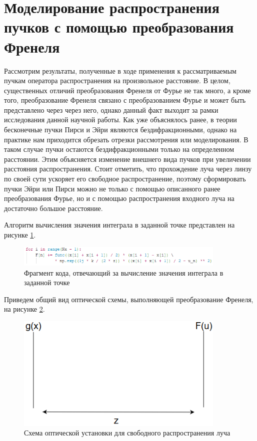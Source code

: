 \section[Моделирование распространения пучков с помощью преобразования Френеля]{\nohyphens{Моделирование распространения пучков с помощью преобразования Френеля}}{
	Рассмотрим результаты, полученные в ходе применения к рассматриваемым пучкам оператора распространения на произвольное расстояние.  В целом, существенных отличий преобразования Френеля от Фурье не так много, а кроме того, преобразование Френеля связано с преобразованием Фурье и может быть представлено через через него, однако данный факт выходит за рамки исследования данной научной работы. Как уже объяснялось ранее, в теории бесконечные пучки Пирси и Эйри являются бездифракционными, однако на практике нам приходится обрезать отрезки рассмотрения или моделирования. В таком случае пучки остаются бездифракционными только на определенном расстоянии. Этим объясняется изменение внешнего вида пучков при увеличении расстояния распространения. Стоит отметить, что прохождение луча через линзу по своей сути ускоряет его свободное распространение, поэтому сформировать пучки Эйри или Пирси можно не только с помощью описанного ранее преобразования Фурье, но и с помощью распространения входного луча на достаточно большое расстояние.
	
	Алгоритм вычисления значения интеграла в заданной точке представлен на рисунке \ref{listing}.
	\begin{figure}[H]
		  \begin{center}
			\includegraphics[width=10cm]{plots/listing}
	\caption{Фрагмент кода, отвечающий за вычисление значения интеграла в заданной точке}
	\label{listing}
		 \end{center}
\end{figure}
	
Приведем общий вид оптической схемы, выполняющей преобразование Френеля, на рисунке \ref{fres_sys}.
	\begin{figure}[H]
		  \begin{center}
			\includegraphics[width=10cm]{plots/fres_sys}
	\caption{Схема оптической установки для свободного распространения луча}
	\label{fres_sys}
		 \end{center}
\end{figure}
	
}
